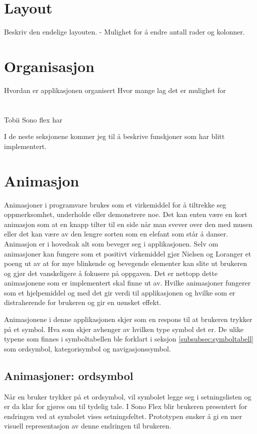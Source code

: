 \documentclass[phd,tocprelim]{cornell}
\begin{document}
\section{Layout}

Beskriv den endelige layouten.
 - Mulighet for å endre antall rader og kolonner.

\section{Organisasjon}
Hvordan er applikasjonen organisert
Hvor mange lag det er  mulighet for


\section{}

Tobii Sono flex har 


I de neste seksjonene kommer jeg til å beskrive funskjoner som har blitt implementert.

\section{Animasjon}

Animasjoner i programvare brukes som et virkemiddel for å tiltrekke seg oppmerksomhet, underholde eller demonstrere noe. Det kan enten være en kort animasjon som at en knapp tilter til en side når man svever over den med musen eller det kan være av den lengre sorten som en elefant som står å danser. Animasjon er i hovedsak alt som beveger seg i applikasjonen. Selv om animasjoner kan fungere som et positivt virkemiddel gjør Nielsen og Loranger et poeng ut av at for mye blinkende og bevegende elementer kan slite ut brukeren og gjør det vanskeligere å fokusere på oppgaven. Det er nettopp dette animasjonene som er implementert skal finne ut av. Hvilke animasjoner fungerer som et hjelpemiddel og med det gir verdi til applikasjonen og hvilke som er distraherende for brukeren og gir en uønsket effekt.


Animasjonene i denne applikasjonen skjer som en respons til at brukeren trykker på et symbol. Hva som skjer avhenger av hvilken type symbol det er. De ulike typene som finnes i symboltabellen ble forklart i seksjon \ref{subsubsec:symboltabell} som ordsymbol, kategorisymbol og navigasjonssymbol. 


\subsection{Animasjoner: ordsymbol}
Når en bruker trykker på et ordsymbol, vil symbolet legge seg i setningslisten og er da klar for gjøres om til tydelig tale. I Sono Flex blir brukeren presentert for endringen ved at symbolet vises setningsfeltet. Prototypen ønsker å gi en mer visuell representasjon av denne endringen til brukeren. 
\end{document}
